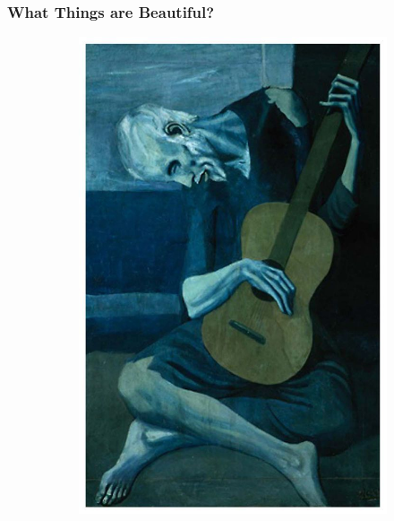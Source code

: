 \documentclass{beamer}
\begin{document}
\begin{frame}  
  \frametitle{What Things are Beautiful?}
  \begin{figure}[t]
    \begin{subfigure}[b]{.3\textwidth}
      \includegraphics[width=.9\textwidth]{images/old-guitarist.jpg}       
    \end{subfigure}
    \pause
    \begin{subfigure}[b]{.3\textwidth}

\end{subfigure}
\end{figure}
\end{frame}
\end{document}
